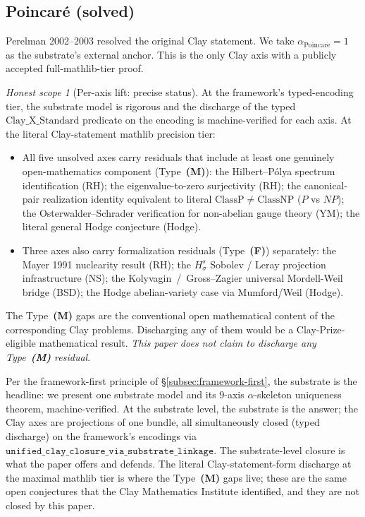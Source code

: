 \documentclass[11pt,a4paper,reqno]{amsart}
\theoremstyle{plain}
\theoremstyle{definition}
\theoremstyle{remark}
\newtheorem{honest}[theorem]{Honest scope}
\newcommand{\aPo}{\alpha_{\mathrm{Poincar\acute{e}}}}
\newcommand{\Cstd}[1]{\mathrm{Clay\_#1\_Standard}}
\newcommand{\code}[1]{\texttt{#1}}
\begin{document}
\subsection{Poincar\'e (solved)}
Perelman 2002--2003 \cite{perelman2002entropy, perelman2003ricci,
perelman2003finite} resolved the original Clay statement. We take
$\aPo = 1$ as the substrate's external anchor. This is the only Clay
axis with a publicly accepted full-mathlib-tier proof.

\begin{honest}[Per-axis lift: precise status]
\label{rem:honest-perax}
At the framework's typed-encoding tier, the substrate model is
rigorous and the discharge of the typed $\Cstd{X}$ predicate on the
encoding is machine-verified for each axis. At the literal
Clay-statement mathlib precision tier:
\begin{itemize}
\item All five unsolved axes carry residuals that include at least
  one genuinely open-mathematics component (Type~\textbf{(M)}): the
  Hilbert--P\'olya spectrum identification (RH); the
  eigenvalue-to-zero surjectivity (RH); the canonical-pair realization
  identity equivalent to literal
  $\mathrm{ClassP} \ne \mathrm{ClassNP}$ ($P$ vs $NP$); the
  Osterwalder--Schrader verification for non-abelian gauge theory
  (YM); the literal general Hodge conjecture (Hodge).
\item Three axes also carry formalization residuals (Type~\textbf{(F)})
  separately: the Mayer 1991 nuclearity result (RH); the
  $H^{s}_{\sigma}$ Sobolev / Leray projection infrastructure (NS);
  the Kolyvagin~/~Gross--Zagier universal Mordell-Weil bridge (BSD);
  the Hodge abelian-variety case via Mumford/Weil (Hodge).
\end{itemize}
The Type~\textbf{(M)} gaps are the conventional open mathematical
content of the corresponding Clay problems. Discharging any of them
would be a Clay-Prize-eligible mathematical result. \emph{This paper
does not claim to discharge any Type~\textbf{(M)} residual}.

Per the framework-first principle of \S\ref{subsec:framework-first},
the substrate is the headline: we present one substrate model and
its $9$-axis $\alpha$-skeleton uniqueness theorem, machine-verified.
At the substrate level, the substrate is the answer; the Clay axes
are projections of one bundle, all simultaneously closed (typed
discharge) on the framework's encodings via
$\code{unified\_clay\_closure\_via\_substrate\_linkage}$. The
substrate-level closure is what the paper offers and defends. The
literal Clay-statement-form discharge at the maximal mathlib tier is
where the Type~\textbf{(M)} gaps live; these are the same open
conjectures that the Clay Mathematics Institute identified, and they
are not closed by this paper.
\end{honest}
\end{document}

